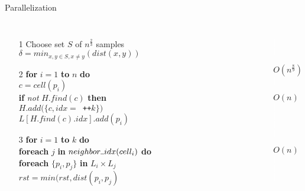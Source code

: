 \documentclass[18pt]{beamer}
\begin{document}
\begin{frame}{Parallelization}
\begin{columns}
\begin{itemize}\itemsep0pt
\item[\footnotesize 1] Choose set $S$ of $n^{\frac{2}{3}}$ samples
						$\delta = min_{x,y \in S, x \neq y}(dist(x, y))$
\item[\footnotesize 2] \textbf{for} $i = 1$ \textbf{to} $n$ \textbf{do} \\
						\hspace{2em}$c = cell(p_i)$ \\
						\hspace{2em}\textbf{if} \textit{not} $H.find(c)$ \textbf{then} \\
						\hspace{4em}$H.add(\{c, idx = $\texttt{ ++}$k\})$ \\
						\hspace{2em}$L[H.find(c).idx].add(p_i)$ \\
\item[\footnotesize 3] %
						\textbf{for} $i = 1$ \textbf{to} $k$ \textbf{do} \\
						\hspace{2em} \textbf{foreach} $j$ \textbf{in} $neighbor\rule{1ex}{0.4pt}idx(cell_i)$ \textbf{do} \\
						\hspace{4em} \textbf{foreach} $\{p_i,p_j\}$ \textbf{in} $L_i \times L_j$ \\
						\hspace{6em} $rst = min(rst, dist(p_i, p_j)$
\end{itemize}

		\begin{itemize}\itemsep0pt
			\item[] \textcolor{white}{$|$}\\ \textcolor{white}{$|$}\\
			\vspace{5pt}
			\item[]$O(n^{\frac{8}{9}})$\\\textcolor{white}{$|$} \\ 					
			\item[]$O(n)$\\\textcolor{white}{$|$} \\\textcolor{white}{$|$} \\ \textcolor{white}{$|$}\\ \textcolor{white}{$|$}\\
			\item[]$O(n)$\\\textcolor{white}{$|$} \\\textcolor{white}{$|$} \\ \textcolor{white}{$|$}\\
		\end{itemize}
\end{columns}
\end{frame}
\end{document}
